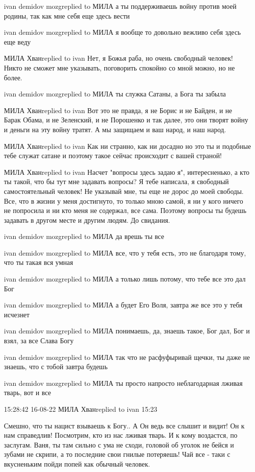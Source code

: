 ivan demidov mozgreplied to МИЛА
а ты поддерживаешь войну против моей родины, так как мне себя еще здесь вести

ivan demidov mozgreplied to МИЛА
я вообще то довольно вежливо себя здесь еще веду

МИЛА Хванreplied to ivan
Нет, я Божья раба, но очень свободный человек! Никто не сможет мне указывать, поговорить спокойно со мной можно, но не более.

ivan demidov mozgreplied to МИЛА
ты служка Сатаны, а Бога ты забыла

МИЛА Хванreplied to ivan
Вот это не правда, я не Борис и не Байден, и не Барак Обама, и не Зеленский, и не Порошенко и так далее, это они творят войну и деньги на эту войну тратят. А мы защищаем и ваш народ, и наш народ.

МИЛА Хванreplied to ivan
Как ни странно, как ни досадно но это ты и подобные тебе служат сатане и поэтому такое сейчас происходит с вашей страной!

МИЛА Хванreplied to ivan
Насчет "вопросы здесь задаю я", интересненько, а кто ты такой, что бы тут мне задавать вопросы? Я тебе написала, я свободный самостоятельный человек! Не указывай мне, ты еще не дорос до моей свободы. Все, что в жизни у меня достигнуто, то только мною самой, я ни у кого ничего не попросила и ни кто меня не содержал, все сама. Поэтому вопросы ты будешь задавать в другом месте и другим людям. До свидания.


ivan demidov mozgreplied to МИЛА
да врешь ты все

ivan demidov mozgreplied to МИЛА
все, что у тебя есть, это не благодаря тому, что ты такая вся умная

ivan demidov mozgreplied to МИЛА
а только лишь потому, что тебе все это дал Бог

ivan demidov mozgreplied to МИЛА
а будет Его Воля, завтра же все это у тебя исчезнет

ivan demidov mozgreplied to МИЛА
понимаешь, да, знаешь такое, Бог дал, Бог и взял, за все Слава Богу

ivan demidov mozgreplied to МИЛА
так что не расфуфыривай щечки, ты даже не знаешь, что с тобой завтра будешь

ivan demidov mozgreplied to МИЛА
ты просто напросто неблагодарная лживая тварь, вот и все


15:28:42 16-08-22
МИЛА Хванreplied to ivan
15:23

Смешно, что ты нацист взываешь к Богу.. А Он ведь все слышит и видит! Он к нам
справедлив! Посмотрим, кто из нас лживая тварь. И к кому воздастся, по
заслугам. Ваня, ты там сильно с ума не сходи, головой об уголок не бейся и
зубами не скрипи, а то последние свои гнилые потеряешь! Чай все - таки с
вкусненьким пойди попей как обычный человек.
